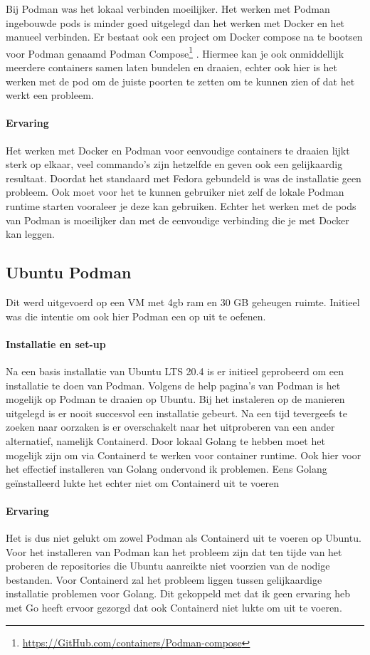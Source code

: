 Bij Podman was het lokaal verbinden moeilijker. Het werken met Podman ingebouwde pods is minder goed uitgelegd dan het werken met Docker en het manueel verbinden.  Er bestaat ook een project om Docker compose na te bootsen voor Podman genaamd Podman Compose\footnote{\url{https://GitHub.com/containers/Podman-compose}} .  Hiermee kan je ook onmiddellijk meerdere containers samen laten bundelen en draaien, echter ook hier is het werken met de pod om de juiste poorten te zetten om te kunnen zien of dat het werkt een probleem.

\paragraph{Ervaring}
Het werken met Docker en Podman voor eenvoudige containers te draaien lijkt sterk op elkaar, veel commando’s zijn hetzelfde en geven ook een gelijkaardig resultaat. Doordat het standaard met Fedora gebundeld is was de installatie geen probleem. Ook moet voor het te kunnen gebruiker niet zelf de lokale Podman runtime starten vooraleer je deze kan gebruiken. Echter het werken met de pods van Podman is moeilijker dan met de eenvoudige verbinding die je met Docker kan leggen.

\subsection{Ubuntu Podman}
Dit werd uitgevoerd op een VM met 4gb ram en 30 GB geheugen ruimte. Initieel was die intentie om ook hier Podman een op uit te oefenen.

\paragraph{Installatie en set-up}
Na een basis installatie van Ubuntu LTS 20.4 is er initieel geprobeerd om een installatie te doen van Podman. Volgens de help pagina’s van Podman is het mogelijk op Podman te draaien op Ubuntu. Bij het instaleren op de manieren uitgelegd is er nooit succesvol een installatie gebeurt. Na een tijd tevergeefs te zoeken naar oorzaken is er overschakelt naar het uitproberen van een ander alternatief, namelijk Containerd.
Door lokaal Golang te hebben moet het mogelijk zijn om via Containerd te werken voor container runtime. Ook hier voor het effectief installeren van Golang ondervond ik problemen.  Eens Golang geïnstalleerd lukte het echter niet om Containerd uit te voeren

\paragraph{Ervaring}
Het is dus niet gelukt om zowel Podman als Containerd uit te voeren op Ubuntu. Voor het installeren van Podman kan het probleem zijn dat ten tijde van het proberen de repositories die Ubuntu aanreikte niet voorzien van de nodige bestanden. Voor Containerd zal het probleem liggen tussen gelijkaardige installatie problemen voor Golang. Dit gekoppeld met dat ik geen ervaring heb met Go heeft ervoor gezorgd dat ook Containerd niet lukte om uit te voeren.

